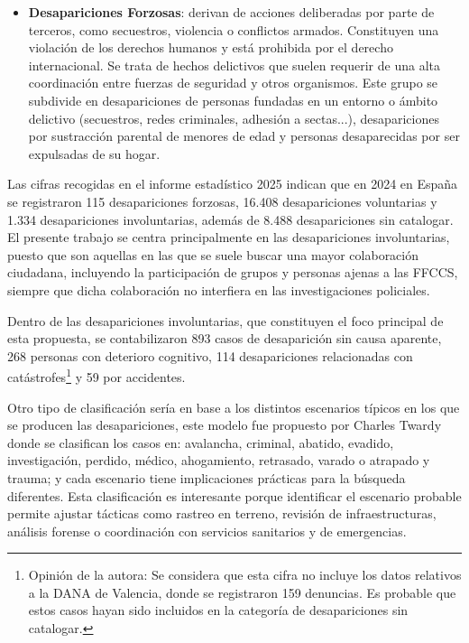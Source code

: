 \begin{itemize}
            \item \textbf{Desapariciones Forzosas}: derivan de acciones deliberadas por parte de terceros, como secuestros, violencia o conflictos armados. Constituyen una violación de los derechos humanos y está prohibida por el derecho internacional. Se trata de hechos delictivos que suelen requerir de una alta coordinación entre fuerzas de seguridad y otros organismos. Este grupo se subdivide en desapariciones de personas fundadas en un entorno o ámbito delictivo (secuestros, redes criminales, adhesión a sectas...), desapariciones por sustracción parental de menores de edad y personas desaparecidas por ser expulsadas de su hogar.
        \end{itemize}    

    Las cifras recogidas en el informe estadístico 2025\cite{InformeCNDES2025} indican que en 2024 en España se registraron 115 desapariciones forzosas, 16.408 desapariciones voluntarias y 1.334 desapariciones involuntarias, además de 8.488 desapariciones sin catalogar. El presente trabajo se centra principalmente en las desapariciones involuntarias, puesto que son aquellas en las que se suele buscar una mayor colaboración ciudadana, incluyendo la participación de grupos y personas ajenas a las FFCCS, siempre que dicha colaboración no interfiera en las investigaciones policiales. 
    
    Dentro de las desapariciones involuntarias, que constituyen el foco principal de esta propuesta, se contabilizaron 893 casos de desaparición sin causa aparente, 268 personas con deterioro cognitivo, 114 desapariciones relacionadas con catástrofes\footnote{Opinión de la autora: Se considera que esta cifra no incluye los datos relativos a la DANA de Valencia, donde se registraron 159 denuncias. Es probable que estos casos hayan sido incluidos en la categoría de desapariciones sin catalogar.} y 59 por accidentes.

    Otro tipo de clasificación sería en base a los distintos escenarios típicos en los que se producen las desapariciones, este modelo fue propuesto por Charles Twardy donde se clasifican los casos en: avalancha, criminal, abatido, evadido, investigación, perdido, médico, ahogamiento, retrasado, varado o atrapado y trauma; y cada escenario tiene implicaciones prácticas para la búsqueda diferentes. Esta clasificación es interesante porque identificar el escenario probable permite ajustar tácticas como rastreo en terreno, revisión de infraestructuras, análisis forense o coordinación con servicios sanitarios y de emergencias.

